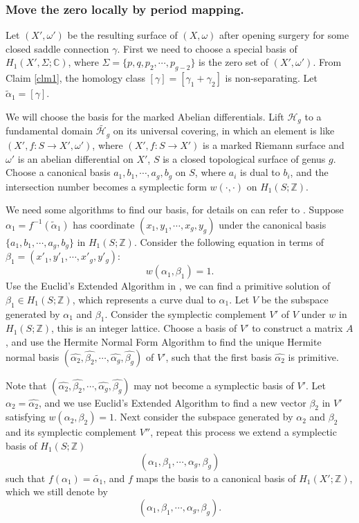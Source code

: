 \documentclass[12pt]{amsart} %
\theoremstyle{definition}
\theoremstyle{remark}
\numberwithin{equation}{section}
\renewcommand\H{{\mathcal H}}
\begin{document}
\subsubsection{Move the zero locally by period mapping.}
Let $(X',\omega')$ be the resulting surface of $(X,\omega)$ after opening surgery for some closed saddle connection $\gamma$.
First we need to choose a special basis of $H_1(X',\Sigma;\mathbb{C})$, where $\Sigma=\{p,q,p_2,\cdots,p_{g-2}\}$
is the zero set of $(X',\omega')$.
From Claim \ref{clm1}, the homology class $[\gamma]=[\gamma_1+\gamma_2]$ is non-separating.
Let $\tilde{\alpha}_1=[\gamma]$.

We will choose the basis for the marked Abelian differentials.
Lift $\H_g$ to a fundamental domain $\tilde{\H_g}$ on its universal covering, in which an
element is like $(X', f: S\to X', \omega')$, where $(X', f: S\to X')$ is a marked Riemann surface and $\omega'$ is an abelian differential on $X'$, 
$S$ is a closed topological surface of genus $g$. Choose a canonical basis $a_1,b_1,\cdots,a_{g},b_{g}$ on $S$, where $a_i$ is dual to $b_i$, and the intersection number becomes a symplectic form $w(\cdot,\cdot)$ on $H_1(S;\mathbb{Z})$.




We need some algorithms to find our basis, for details on can refer to \cite{Cohen1993}.
Suppose $\alpha_1=f^{-1}(\tilde{\alpha}_1)$ has coordinate $(x_1,y_1,\cdots,x_{g},y_g)$ under the canonical basis $\{a_1,b_1,\cdots,a_{g},b_{g}\}$ in $H_1(S;\mathbb{Z})$. Consider the following equation in terms of 
$\beta_1=(x'_1,y'_1,\cdots,x'_{g},y'_g)$:
$$w(\alpha_1,\beta_1)=1.$$
Use the Euclid's Extended Algorithm in \cite[$\S$1.3.2]{Cohen1993}, we can find a primitive solution of
$\beta_1 \in H_1(S;\mathbb{Z})$, which represents a curve dual to $\alpha_1$. Let $V$ be the subspace generated by $\alpha_1$ and $\beta_1$.
Consider the symplectic complement $V'$ of $V$ under $w$ in $H_1(S;\mathbb{Z})$, this is
an integer lattice. Choose a basis of $V'$ to construct a matrix $A$, and use the Hermite
Normal Form Algorithm \cite[$\S$2.4.2]{Cohen1993} to find the unique Hermite normal basis
$(\hat{\alpha_2},\hat{\beta_2},\cdots,\hat{\alpha_g},\hat{\beta_g})$ of $V'$, such that
the first basis $\hat{\alpha_2}$ is primitive.

Note that $(\hat{\alpha_2},\hat{\beta_2},\cdots,\hat{\alpha_g},\hat{\beta_g})$ may not become a symplectic basis of $V'$. Let $\alpha_2=\hat{\alpha_2}$, and
we use Euclid's Extended Algorithm to find a new vector $\beta_2$ in $V'$
satisfying $w(\alpha_2,\beta_2)=1$.
Next consider the subspace  generated by $\alpha_2$ and $\beta_2$ and its
symplectic complement $V''$,
repeat this process we extend a symplectic basis of $H_1(S;\mathbb{Z})$
$$(\alpha_1,\beta_1,\cdots,\alpha_g,\beta_g)$$
such that $f(\alpha_1)=\tilde{\alpha_1}$, and $f$ maps the basis to a canonical basis
of $H_1(X';\mathbb{Z})$, which we still denote by
$$(\alpha_1,\beta_1,\cdots,\alpha_g,\beta_g).$$
\end{document}
